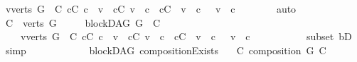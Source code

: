 \begin{isabellebody}
\ {\isachardoublequoteopen}{\isacharparenleft}{\kern0pt}{\isasymforall}v{\isasymin}verts\ G\ {\isacharminus}{\kern0pt}\ C{\isachardot}{\kern0pt}\ {\isacharparenleft}{\kern0pt}{\isasymforall}c{\isasymin}C{\isachardot}{\kern0pt}\ c\ {\isasymrightarrow}\isactrlsup {\isacharasterisk}{\kern0pt}\ v{\isacharparenright}{\kern0pt}\ {\isasymor}\ {\isacharparenleft}{\kern0pt}{\isasymforall}c{\isasymin}C{\isachardot}{\kern0pt}\ v\ {\isasymrightarrow}\isactrlsup {\isacharasterisk}{\kern0pt}\ c{\isacharparenright}{\kern0pt}\ {\isasymor}\ {\isacharparenleft}{\kern0pt}{\isasymforall}c{\isasymin}C{\isachardot}{\kern0pt}\ {\isasymnot}\ v\ {\isasymrightarrow}\isactrlsup {\isacharasterisk}{\kern0pt}\ c\ {\isasymand}\ {\isasymnot}\ v\ {\isasymrightarrow}\isactrlsup {\isacharasterisk}{\kern0pt}\ c{\isacharparenright}{\kern0pt}{\isacharparenright}{\kern0pt}{\isachardoublequoteclose}\isanewline
\ \ \ \ \ \ \isamarkupfalse%
\ auto\isanewline
\ \ \ \ \isamarkupfalse%
\ \isamarkupfalse%
\ {\isachardoublequoteopen}C\ {\isasymsubseteq}\ verts\ G\ {\isasymand}\isanewline
\ \ \ \ blockDAG\ {\isacharparenleft}{\kern0pt}G\ {\isasymrestriction}\ C{\isacharparenright}{\kern0pt}\ {\isasymand}\isanewline
\ \ \ \ {\isacharparenleft}{\kern0pt}{\isasymforall}v{\isasymin}verts\ G\ {\isacharminus}{\kern0pt}\ C{\isachardot}{\kern0pt}\ {\isacharparenleft}{\kern0pt}{\isasymforall}c{\isasymin}C{\isachardot}{\kern0pt}\ c\ {\isasymrightarrow}\isactrlsup {\isacharasterisk}{\kern0pt}\ v{\isacharparenright}{\kern0pt}\ {\isasymor}\ {\isacharparenleft}{\kern0pt}{\isasymforall}c{\isasymin}C{\isachardot}{\kern0pt}\ v\ {\isasymrightarrow}\isactrlsup {\isacharasterisk}{\kern0pt}\ c{\isacharparenright}{\kern0pt}\ {\isasymor}\ {\isacharparenleft}{\kern0pt}{\isasymforall}c{\isasymin}C{\isachardot}{\kern0pt}\ {\isasymnot}\ v\ {\isasymrightarrow}\isactrlsup {\isacharasterisk}{\kern0pt}\ c\ {\isasymand}\ {\isasymnot}\ v\ {\isasymrightarrow}\isactrlsup {\isacharasterisk}{\kern0pt}\ c{\isacharparenright}{\kern0pt}{\isacharparenright}{\kern0pt}{\isachardoublequoteclose}\ \isanewline
\ \ \ \ \ \ \ \ \isamarkupfalse%
\ subset\ bD\ \isamarkupfalse%
\ simp\isanewline
\ \ \ \ \isamarkupfalse%
\ \ \isanewline
\ \ \isamarkupfalse%
%
\endisatagproof
{\isafoldproof}%
%
\isadelimproof
\isanewline
%
\endisadelimproof
\isanewline
{}\isamarkupfalse%
\ {\isacharparenleft}{\kern0pt}\ blockDAG{\isacharparenright}{\kern0pt}\ compositionExists{\isacharcolon}{\kern0pt}\isanewline
\ \ \ {\isachardoublequoteopen}{\isasymexists}C{\isachardot}{\kern0pt}\ composition\ G\ C{\isachardoublequoteclose}\isanewline

\end{isabellebody}

